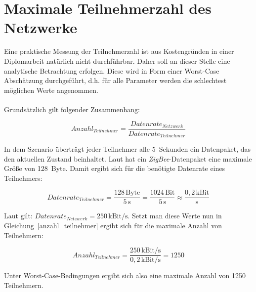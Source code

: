 \section{Maximale Teilnehmerzahl des Netzwerke}\label{maximale_teilnehmerzahl}

Eine praktische Messung der Teilnehmerzahl ist aus Kostengründen in einer Diplomarbeit natürlich nicht durchführbar. Daher
soll an dieser Stelle eine analytische Betrachtung erfolgen. Diese wird in Form einer Worst-Case Abschätzung durchgeführt, 
d.h. für alle Parameter werden die schlechtest möglichen Werte angenommen.\\
\\
Grundsätzlich gilt folgender Zusammenhang:

\begin{equation}
   Anzahl_{Teilnehmer} = \frac{Datenrate_{Netzwerk}}{Datenrate_{Teilnehmer}}
   \label{anzahl_teilnehmer}
\end{equation}

In dem Szenario überträgt jeder Teilnehmer alle 5~Sekunden ein Datenpaket, das den aktuellen Zustand beinhaltet.
Laut \cite{zigbee_specification} hat ein \emph{ZigBee}-Datenpaket eine maximale Größe von 128~Byte. Damit ergibt sich für die
benötigte Datenrate eines Teilnehmers:

\begin{equation}
    Datenrate_{Teilnehmer} = \frac{128\,\text{Byte}}{5\,\text{s}} = \frac{1024\,\text{Bit}}{5\,\text{s}} \approx \frac{0,2\,\text{kBit}}{\text{s}}
\end{equation}

Laut \cite{zigbee_specification} gilt: $Datenrate_{Netzwerk} = 250\,\text{kBit/s}$. Setzt man diese Werte nun in 
Gleichung~\ref{anzahl_teilnehmer} ergibt sich für die maximale Anzahl von Teilnehmern:

\begin{equation}
    Anzahl_{Teilnehmer} = \frac{250\,\text{kBit/s}}{0,2\,\text{kBit/s}} = 1250
\end{equation}

Unter Worst-Case-Bedingungen ergibt sich also eine maximale Anzahl von 1250 Teilnehmern.
